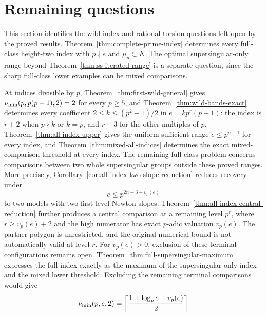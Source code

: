 \section{Remaining questions}\label{sec:open}
This section identifies the wild-index and rational-torsion questions left open by the proved results. Theorem~\ref{thm:complete-prime-index} determines every full-class height-two index with $p\nmid e$ and $\mu_p\subset K$. The optimal supersingular-only range beyond Theorem~\ref{thm:ss-iterated-range} is a separate question, since the sharp full-class lower examples can be mixed comparisons.

At indices divisible by $p$, Theorem~\ref{thm:first-wild-general} gives $\nu_{\min}(p,p(p-1),2)=2$ for every $p\ge5$, and Theorem~\ref{thm:wild-bands-exact} determines every coefficient $2\le k\le(p^2-1)/2$ in $e=kp^r(p-1)$: the index is $r+2$ when $p\nmid k$ or $k=p$, and $r+3$ for the other multiples of $p$. Theorem~\ref{thm:all-index-upper} gives the uniform sufficient range $e\le p^{n-1}$ for every index, and Theorem~\ref{thm:mixed-all-indices} determines the exact mixed-comparison threshold at every index. The remaining full-class problem concerns comparisons between two whole supersingular groups outside these proved ranges. More precisely, Corollary~\ref{cor:all-index-two-slope-reduction} reduces recovery under
\[
 e\le p^{2n-3-v_p(e)}
\]
to two models with two first-level Newton slopes. Theorem~\ref{thm:all-index-central-reduction} further produces a central comparison at a remaining level $p^r$, where $r\ge v_p(e)+2$ and the high numerator has exact $p$-adic valuation $v_p(e)$. The partner polygon is unrestricted, and the original numerical bound is not automatically valid at level $r$. For $v_p(e)>0$, exclusion of these terminal configurations remains open. Theorem~\ref{thm:full-supersingular-maximum} expresses the full index exactly as the maximum of the supersingular-only index and the mixed lower threshold. Excluding the remaining terminal comparisons would give
\[
 \nu_{\min}(p,e,2)=\left\lceil\frac{1+\log_p e+v_p(e)}2\right\rceil
\]
